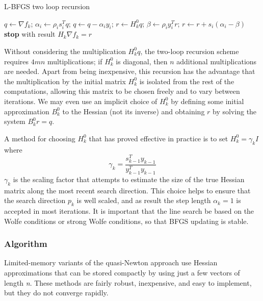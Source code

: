 \begin{algorithm}[H]
	\caption{L-BFGS two loop recursion}
	\label{}
	\begin{algorithmic}[3]
	
		\State $q \gets \nabla f_{k}$;
        \State $ \alpha_{i} \gets \rho_{i}s^T_{i}q$;
        \State $q \gets q - \alpha_{i}y_{i}$; 
      \EndFor
 	  \State $r \gets H^0_{k}q$;
 	  \State $\beta \gets \rho_{i}y^T_{i}r$; 
 	  \State $r \gets r + s_{i}(\alpha_{i}-\beta)$
 	  \EndFor
	  \State \textbf{stop} with result $H_{k}\nabla f_{k}=r$
	\end{algorithmic}
\end{algorithm}
Without considering the multiplication $H^0_{k}q $, the two-loop recursion scheme requires $4mn$ multiplications; if $H^0_{k}$ is diagonal, then $n$ additional multiplications are needed. Apart from being inexpensive, this recursion has the advantage that the multiplication by the initial matrix $H^0_{k}$ is isolated from the rest of the computations, allowing this matrix to be chosen freely and to vary between iterations. We may even use an implicit choice of $H^0_{k}$ by defining some initial approximation $B^0_{k}$ to the Hessian (not its inverse) and obtaining $r$ by solving the system $B^0_{k}r = q$. 

A method for choosing $H^0_{k}$ that has proved effective in practice is to set $H^0_{k}=\gamma_{k}I$  where 
\begin{equation}
\gamma_{k}= \frac{s^T_{k-1}y_{k-1}}{y^T_{k-1}y_{k-1}}
\end{equation}
$\gamma_{k}$ is the scaling factor that attempts to estimate the size of the true Hessian matrix along the most recent search direction. This choice helps to ensure that the search direction $p_{k}$ is well scaled, and as result the step length $\alpha_{k}=1$ is accepted in most iterations. It is important that the line search be based on the Wolfe conditions or strong Wolfe conditions, so that BFGS updating is stable. 

\subsubsection{Algorithm}
Limited-memory variants  of  the  quasi-Newton  approach use  Hessian  approximations  that  can  be stored compactly by using just a few vectors of length \textit{n}. These methods are fairly robust, inexpensive, and easy to implement, but they do not converge rapidly.


